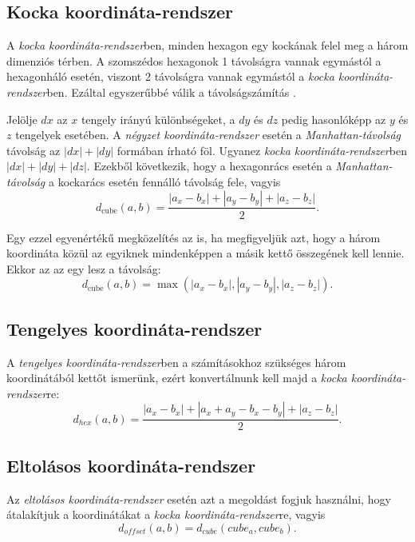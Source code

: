 \subsection{Kocka koordináta-rendszer}

A \textit{kocka koordináta-rendszer}ben, minden hexagon egy kockának felel meg a három dimenziós térben. A szomszédos hexagonok 1 távolságra vannak egymástól a hexagonháló esetén, viszont 2 távolságra vannak egymástól a \textit{kocka koordináta-rendszer}ben. Ezáltal egyszerűbbé válik a távolságszámítás \cite{HexagonalGrids}.

Jelölje $dx$ az $x$ tengely irányú különbségeket, a $dy$ és $dz$ pedig hasonlóképp az $y$ és $z$ tengelyek esetében. A \textit{négyzet koordináta-rendszer} esetén a \textit{Manhattan-távolság} távolság az $|dx| + |dy|$ formában írható föl. Ugyanez \textit{kocka koordináta-rendszer}ben $|dx| + |dy| + |dz|$. Ezekből következik, hogy a hexagonrács esetén a \textit{Manhattan-távolság} a kockarács esetén fennálló távolság fele, vagyis
$$
d_{\text{cube}}(a, b) =
\dfrac{|a_x - b_x| + |a_y - b_y| + |a_z - b_z|}{2}.
$$

Egy ezzel egyenértékű megközelítés az is, ha megfigyeljük azt, hogy a három koordináta közül az egyiknek mindenképpen a másik kettő összegének kell lennie. Ekkor az az egy lesz a távolság:
$$
d_{\text{cube}}(a, b) =
\max(
|a_x - b_x|, |a_y - b_y|, |a_z - b_z|
).
$$

\subsection{Tengelyes koordináta-rendszer}

A \textit{tengelyes koordináta-rendszer}ben a számításokhoz szükséges három koordinátából kettőt ismerünk, ezért konvertálnunk kell majd a \textit{kocka koordináta-rendszer}re:
$$
d_{hex}(a, b) = \frac{|a_x - b_x| + |a_x + a_y - b_x - b_y| + |a_z - b_z|}{2}.
$$

\subsection{Eltolásos koordináta-rendszer}

Az \textit{eltolásos koordináta-rendszer} esetén azt a megoldást fogjuk használni, hogy átalakítjuk a koordinátákat a \textit{kocka koordináta-rendszer}re, vagyis
$$
d_{of\!fset} (a, b) = d_{cube}(cube_a, cube_b).
$$

